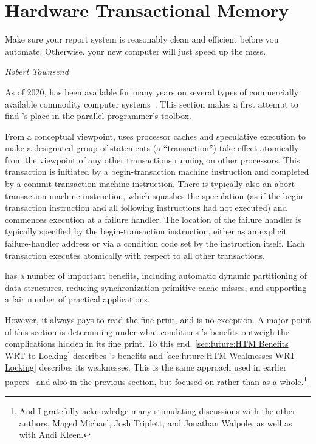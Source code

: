 
\section{Hardware Transactional Memory}
\label{sec:future:Hardware Transactional Memory}
%
\epigraph{Make sure your report system is reasonably clean and efficient
	  before you automate.
	  Otherwise, your new computer will just speed up the mess.}
	 {\emph{Robert Townsend}}

As of 2020,  has been available for many
years on several types of commercially available commodity computer
systems~\cite{Yoo:2013:PEI:2503210.2503232,RickMerrit2011PowerTM,ChristianJacobi2012MainframeTM}.
This section makes a first attempt to find 's place in the parallel
programmer's toolbox.

From a conceptual viewpoint,  uses processor caches and speculative
execution to make a designated group of statements (a ``transaction'')
take effect atomically
from the viewpoint of any other transactions running on other processors.
This transaction is initiated by a
begin-transaction machine instruction and completed by a commit-transaction
machine instruction.
There is typically also an abort-transaction machine instruction, which
squashes the speculation (as if the begin-transaction instruction and
all following instructions had not executed) and commences execution
at a failure handler.
The location of the failure handler is typically specified by the
begin-transaction instruction, either as an explicit failure-handler
address or via a condition code set by the instruction itself.
Each transaction executes atomically with respect to all other transactions.

 has a number of important benefits, including automatic
dynamic partitioning of data structures, reducing synchronization-primitive
cache misses, and supporting a fair number of practical applications.

However, it always pays to read the fine print, and  is no exception.
A major point of this section is determining under what conditions 's
benefits outweigh the complications hidden in its fine print.
To this end, \cref{sec:future:HTM Benefits WRT to Locking}
describes 's benefits and
\cref{sec:future:HTM Weaknesses WRT Locking} describes its weaknesses.
This is the same approach used in earlier
papers~\cite{McKenney2007PLOSTM,PaulEMcKenney2010OSRGrassGreener}
and also in the previous section,
but focused on  rather than  as a whole.\footnote{
	And I gratefully acknowledge many stimulating
	discussions with the other authors, Maged Michael, Josh Triplett,
	and Jonathan Walpole, as well as with Andi Kleen.}

